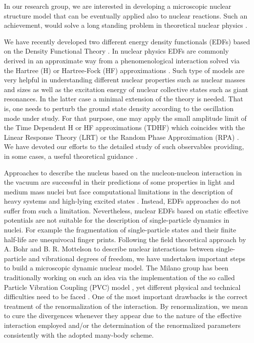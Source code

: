 \documentclass[12pt,a4paper,final]{iopart}
\begin{document}
In our research group, we are interested in developing a microscopic nuclear structure model that can be eventually applied also to nuclear reactions. Such an achievement, would solve a long standing problem in theoretical nuclear physics \cite{nazarewicz2016}. 

We have recently developed two different energy density functionals (EDFs) \cite{ddmed,sami} based on the Density Functional Theory \cite{HK,KS2,engel2011}. In nuclear physics EDFs are commonly derived in an approximate way from a phenomenological interaction solved via the Hartree (H) or Hartree-Fock (HF) approximations \cite{bender2003,vretenar2005}. Such type of models are very helpful in understanding different nuclear properties such as nuclear masses and sizes as well as the excitation energy of nuclear collective states such as giant resonances. In the latter case a minimal extension of the theory is needed. That is, one needs to perturb the ground state density according to the oscillation mode under study. For that purpose, one may apply the small amplitude limit of the Time Dependent H or HF approximations (TDHF) which coincides with the Linear Response Theory (LRT) or the Random Phase Approximation (RPA) \cite{ringschuck, nakatsukasa2007, colo13}. We have devoted our efforts to the detailed study of such observables providing, in some cases, a useful theoretical guidance \cite{bortignonbook,centelles09,roca-maza2011,roca-maza2012,liang2012,roca-maza2013,roca-maza2013a,roca-maza2015,cao2015}.

Approaches to describe the nucleus based on the nucleon-nucleon interaction in the vacuum are successful in their predictions of some properties in light and medium mass nuclei but face computational limitations in the description of heavy systems and high-lying excited states \cite{dickhoff2004, lee2009, bogner2010, barrett2013, hagen2014, carlson2015, shen2016}. Instead, EDFs approaches do not suffer from such a limitation. Nevertheless, nuclear EDFs based on static effective potentials are not suitable for the description of single-particle dynamics in nuclei. For example the fragmentation of single-particle states \cite{bernard1980, colo2010} and their finite half-life are unequivocal finger prints. Following the field theoretical approach by A. Bohr and B. R. Mottelson \cite{BM,BMbook,BMvol} to describe nuclear interactions between single-particle and vibrational degrees of freedom, we have undertaken important steps to build a microscopic dynamic nuclear model. The Milano group has been traditionally working on such an idea via the implementation of the so called Particle Vibration Coupling (PVC) model \cite{bortignon1977, bertsch1983, colo1994}, yet different physical and technical difficulties need to be faced \cite{moghrabi2010, moghrabi2012, brenna2014, yang2016}. One of the most important drawbacks is the correct treatment of the renormalization of the interaction. By renormalization, we mean to cure the divergences whenever they appear due to the nature of the effective interaction employed and/or the determination of the renormalized parameters consistently with the adopted many-body scheme. 
\end{document}
